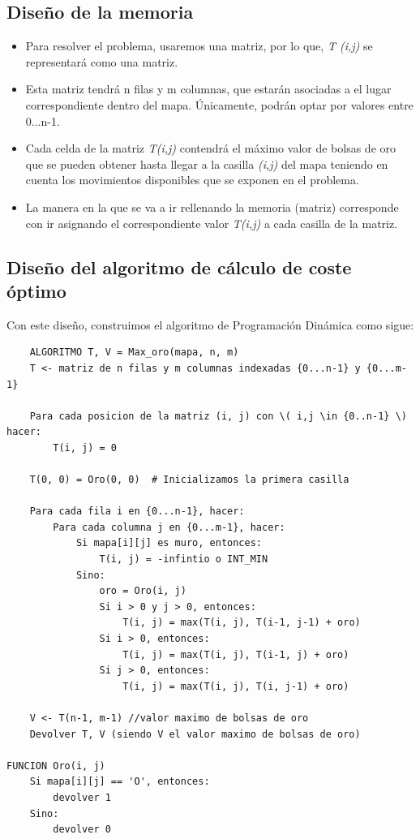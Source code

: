 \subsection{Diseño de la memoria}
\begin{itemize}
    \item Para resolver el problema, usaremos una matriz, por lo que, \textit{T (i,j)} se representará como una matriz.
    \item Esta matriz tendrá n filas y m columnas, que estarán asociadas a el lugar correspondiente dentro del mapa. Únicamente, podrán optar por valores entre {0...n-1}.
    \item Cada celda de la matriz \textit{T(i,j)} contendrá el máximo valor de bolsas de oro que se pueden obtener hasta llegar a la casilla \textit{(i,j)} del mapa teniendo en cuenta los movimientos disponibles que se exponen en el problema.
    \item La manera en la que se va a ir rellenando la memoria (matriz) corresponde con ir asignando el correspondiente valor \textit{T(i,j)} a cada casilla de la matriz.
\end{itemize}

\subsection{Diseño del algoritmo de cálculo de coste óptimo}

Con este diseño, construimos el algoritmo de Programación Dinámica como sigue:

\begin{lstlisting}
    ALGORITMO T, V = Max_oro(mapa, n, m)
    T <- matriz de n filas y m columnas indexadas {0...n-1} y {0...m-1}
    
    Para cada posicion de la matriz (i, j) con \( i,j \in {0..n-1} \) hacer:
        T(i, j) = 0
    
    T(0, 0) = Oro(0, 0)  # Inicializamos la primera casilla
    
    Para cada fila i en {0...n-1}, hacer:
        Para cada columna j en {0...m-1}, hacer:
            Si mapa[i][j] es muro, entonces:
                T(i, j) = -infintio o INT_MIN
            Sino:
                oro = Oro(i, j)
                Si i > 0 y j > 0, entonces:
                    T(i, j) = max(T(i, j), T(i-1, j-1) + oro)
                Si i > 0, entonces:
                    T(i, j) = max(T(i, j), T(i-1, j) + oro)
                Si j > 0, entonces:
                    T(i, j) = max(T(i, j), T(i, j-1) + oro)
    
    V <- T(n-1, m-1) //valor maximo de bolsas de oro
    Devolver T, V (siendo V el valor maximo de bolsas de oro)

FUNCION Oro(i, j)
    Si mapa[i][j] == 'O', entonces:
        devolver 1
    Sino:
        devolver 0

        
\end{lstlisting}

